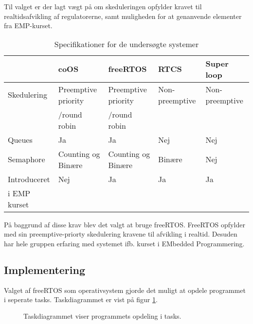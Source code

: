 Til valget er der lagt vægt på om skeduleringen opfylder kravet til realtidsafvikling af regulatorerne, samt muligheden for at genanvende elementer fra EMP-kurset.

\begin{table}[h!]
\begin{tabular}{|l|l|l|l|l|}
\hline 
 & coOS & freeRTOS & RTCS & Super loop \\ 
\hline 
Skedulering & Preemptive priority  & Preemptive priority  & Non-preemptive & Non-preemptive  \\ 
			& /round robin		&	/round robin & &	\\
\hline 
Queues & Ja & Ja & Nej & Nej \\ 
\hline 
Semaphore & Counting og Binære  & Counting og Binære & Binære  & Nej  \\ 
\hline 
Introduceret & Nej & Ja & Ja & Ja \\ 
i EMP kurset &   &   &   &   \\
\hline 
\end{tabular} 
\caption{Specifikationer for de undersøgte systemer}
\label{tb:os_comparison}
\end{table}



På baggrund af disse krav blev det valgt at bruge freeRTOS. FreeRTOS opfylder med sin preemptive-priorty skedulering kravene til afvikling i realtid. 
Desuden har hele gruppen erfaring med systemet ifb. kurset i EMbedded Programmering. 



%
\subsection{Implementering}
% 
% 

Valget af freeRTOS som operativsystem gjorde det muligt at opdele programmet i seperate tasks. Taskdiagrammet er vist på figur \ref{fig:task_diagram}. 

\begin{figure}[!h]
\centering
\begin{tikzpicture}[node distance = 3.2cm]
	
\end{tikzpicture}
\caption[Task diagram]{Taskdiagrammet viser programmets opdeling i tasks.}
\label{fig:task_diagram}
\end{figure}

